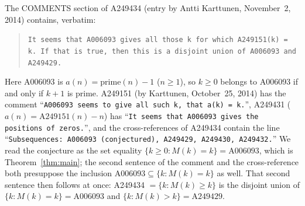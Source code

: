 \documentclass[11pt]{amsart}
\theoremstyle{plain}
\theoremstyle{definition}
\begin{document}
The COMMENTS section of A249434 \cite{A249434} (entry by Antti Karttunen, November~2, 2014) contains, verbatim:
\begin{quote}
{\small\texttt{It seems that A006093 gives all those k for which A249151(k) = k. If that is true, then this is a disjoint union of A006093 and A249429.}}
\end{quote}
Here A006093 \cite{A006093} is $a(n)=\mathrm{prime}(n)-1$ ($n\ge1$), so $k\ge0$ belongs to A006093 if and only if $k+1$ is prime.
A249151 (by Karttunen, October~25, 2014) has the comment ``\texttt{A006093 seems to give all such k, that a(k) = k.}'', A249431 ($a(n)=\text{A249151}(n)-n$) has ``\texttt{It seems that A006093 gives the positions of zeros.}'', and the cross-references of A249434 contain the line ``\texttt{Subsequences: A006093 (conjectured), A249429, A249430, A249432.}''
We read the conjecture as the set equality $\{k\ge0: M(k)=k\}=\text{A006093}$, which is Theorem~\ref{thm:main}; the second sentence of the comment and the cross-reference both presuppose the inclusion $\text{A006093}\subseteq\{k: M(k)=k\}$ as well. That second sentence then follows at once: A249434 $=\{k: M(k)\ge k\}$ is the disjoint union of $\{k: M(k)=k\}=\text{A006093}$ and $\{k:M(k)>k\}=\text{A249429}$.
\end{document}
